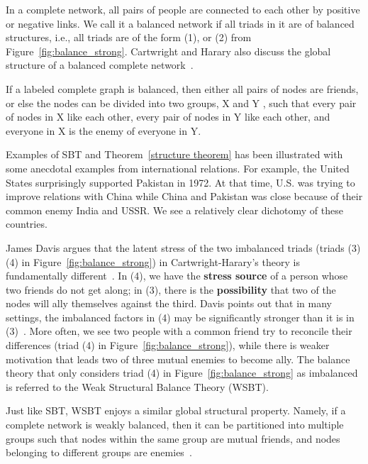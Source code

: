 In a complete network, all pairs of people are connected to each other by positive or negative links. We call it a balanced network if all triads in it are of balanced structures, i.e., all triads are of the form (1), or (2) from Figure~\ref{fig:balance_strong}. Cartwright and Harary also discuss the global structure of a balanced complete network~\cite{Cartwright:56}. 
\begin{theorem}\label{structure theorem}
If a labeled complete graph is balanced, then either all pairs
of nodes are friends, or else the nodes can be divided into two groups, X and Y ,
such that every pair of nodes in X like each other, every pair of nodes in Y like
each other, and everyone in X is the enemy of everyone in Y.
\end{theorem}
Examples of SBT and Theorem~\ref{structure theorem} has been illustrated with some anecdotal examples from international relations. For example, the United States surprisingly supported Pakistan in 1972. At that time, U.S. was trying to improve relations with China while China and Pakistan was close because of their common enemy India and USSR. We see a relatively clear dichotomy of these countries.

James Davis argues that the latent stress of the two imbalanced triads (triads (3) (4) in Figure~\ref{fig:balance_strong}) in Cartwright-Harary's theory is fundamentally different~\cite{Davis:67}. In (4), we have the {\bf stress source} of a person whose two friends do not get along; in (3), there is the {\bf possibility} that two of the nodes will ally themselves against the third.
Davis points out that in many settings, the imbalanced factors in (4) may
be significantly stronger than it is in (3)~\cite{Davis:67}. More often, we see two people with a common friend try to reconcile their differences (triad (4) in Figure~\ref{fig:balance_strong}), while there is weaker motivation that leads two of three mutual enemies to become ally. The balance theory that only considers triad (4) in Figure~\ref{fig:balance_strong} as imbalanced is referred to the Weak Structural Balance Theory (WSBT). 

Just like SBT, WSBT enjoys a similar global structural property. Namely, if a complete network is weakly balanced, then it can be partitioned into multiple groups such that nodes within the same group are mutual friends, and nodes belonging to different groups are enemies~\cite{Davis:67}.  


